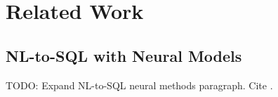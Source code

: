 \documentclass[conference]{IEEEtran}
\begin{document}
\section{Related Work}
\label{sec:related}






\subsection{NL-to-SQL with Neural Models}
TODO: Expand NL-to-SQL neural methods paragraph. Cite \cite{TODO:seq2sql,TODO:sqlnet,TODO:ratsql,TODO:bridge,TODO:sqlcoder,TODO:dinsql}.
\end{document}
